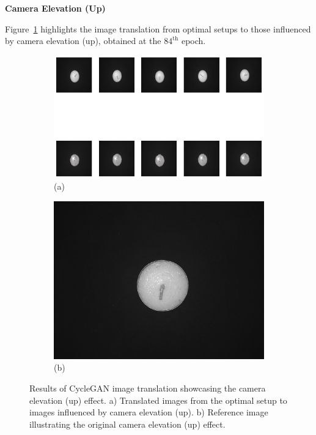 \documentclass[12pt,DIV14,BCOR12mm,a4paper,footinclude=false,headinclude,parskip=half-,twoside,openright,cleardoublepage=empty,toc=index,bibliography=totoc,listof=totoc]{scrreprt}
\numberwithin{equation}{chapter}
\begin{document}
\textbf{Camera Elevation (Up)}

Figure~\ref{fig:camera_elevation_up_result} highlights the image translation from optimal setups to those influenced by camera elevation (up), obtained at the \( 84^{\text{th}} \) epoch. 

\begin{figure}
    \centering
    \begin{subfigure}[b]{1.0\textwidth}
        \centering
        \includegraphics[width=\textwidth]{../media/candles_dark.png}
        \caption*{(a)}
    \end{subfigure}
    \hfill
    \begin{subfigure}[b]{0.25\textwidth}
        \centering
        \includegraphics[width=\textwidth]{../media/candles_dark_real.png}
        \caption*{(b)}
    \end{subfigure}
    \caption{Results of CycleGAN image translation showcasing the camera elevation (up) effect. a) Translated images from the optimal setup to images influenced by camera elevation (up). b) Reference image illustrating the original camera elevation (up) effect.}
    \label{fig:camera_elevation_up_result}
\end{figure}
\end{document}
